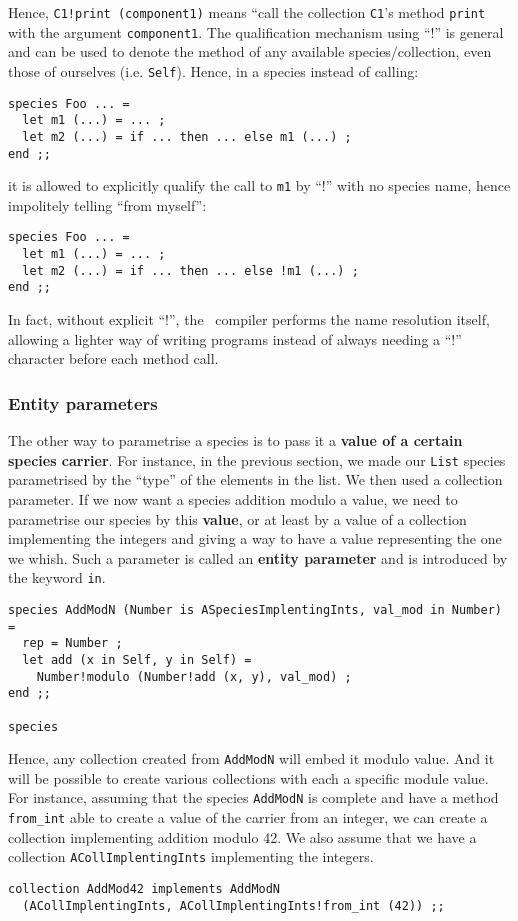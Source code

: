 Hence, {\tt C1!print (component1)} means ``call the collection
{\tt C1}'s method {\tt print} with the argument {\tt component1}. The
qualification mechanism using ``!'' is general and can be used to
denote the method of any available species/collection, even those of
ourselves (i.e. {\tt Self}). Hence, in a species instead of calling:
{\scriptsize
\begin{lstlisting}
species Foo ... =
  let m1 (...) = ... ;
  let m2 (...) = if ... then ... else m1 (...) ;
end ;;
\end{lstlisting}
}
it is allowed to explicitly qualify the call to {\tt m1} by ``!''
with no species name, hence impolitely telling ``from myself'':
{\scriptsize
\begin{lstlisting}
species Foo ... =
  let m1 (...) = ... ;
  let m2 (...) = if ... then ... else !m1 (...) ;
end ;;
\end{lstlisting}
}
In fact, without explicit ``!'', the \focal\ compiler performs the
name resolution itself, allowing a lighter way of writing programs
instead of always needing a ``!'' character before each method call.



\subsubsection{Entity parameters}
\label{entity-parameter}
The other way to parametrise a species is to pass it a
{\bf value of a certain species carrier}. For instance, in the
previous section, we made our {\tt List} species parametrised by the
``type'' of the elements in the list. We then used a collection
parameter. If we now want a species addition modulo a value, we need
to parametrise our species by this {\bf value}, or at least by a
value of a collection implementing the integers and giving a way to
have a value representing the one we whish. Such a parameter is called
an {\bf entity parameter} and is introduced by the keyword {\tt in}.
{\scriptsize
\begin{lstlisting}
species AddModN (Number is ASpeciesImplentingInts, val_mod in Number) =
  rep = Number ;
  let add (x in Self, y in Self) =
    Number!modulo (Number!add (x, y), val_mod) ;
end ;;

species
\end{lstlisting}
}

Hence, any collection created from {\tt AddModN} will embed it modulo
value. And it will be possible to create various collections with each
a specific module value. For instance, assuming that the species
{\tt AddModN} is complete and have a method {\tt from\_int} able to
create a value of the carrier from an integer, we can create a
collection implementing addition modulo 42. We also assume that we
have a collection {\tt ACollImplentingInts} implementing the
integers.
{\scriptsize
\begin{lstlisting}
collection AddMod42 implements AddModN
  (ACollImplentingInts, ACollImplentingInts!from_int (42)) ;;
\end{lstlisting}
}


